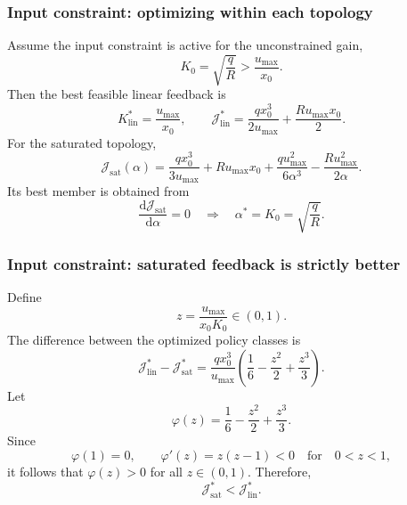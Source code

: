 \begin{frame}
	\frametitle{Input constraint: optimizing within each topology}
	Assume the input constraint is active for the unconstrained gain,
	\begin{equation*}
		K_0=\sqrt{\frac{q}{R}}>\frac{u_{\max}}{x_0} .
	\end{equation*}\pause%
	Then the best feasible linear feedback is
	\begin{equation*}
		K_{\mathrm{lin}}^*=\frac{u_{\max}}{x_0},
		\qquad
		\mathcal{J}_{\mathrm{lin}}^*
		=\frac{q x_0^3}{2u_{\max}}+
		\frac{R u_{\max}x_0}{2} .
	\end{equation*}\pause%
	For the saturated topology,
	\begin{equation*}
		\mathcal{J}_{\mathrm{sat}}(\alpha)
		=\frac{q x_0^3}{3u_{\max}}+Ru_{\max}x_0
		+\frac{q u_{\max}^2}{6\alpha^3}
		-\frac{R u_{\max}^2}{2\alpha} .
	\end{equation*}\pause%
	Its best member is obtained from
	\begin{equation*}
		\frac{\mathrm{d}\mathcal{J}_{\mathrm{sat}}}{\mathrm{d}\alpha}=0
		\quad\Rightarrow\quad
		\alpha^*=K_0=\sqrt{\frac{q}{R}} .
	\end{equation*}
\end{frame}

\begin{frame}
	\frametitle{Input constraint: saturated feedback is strictly better}
	Define
	\begin{equation*}
		z=\frac{u_{\max}}{x_0K_0}\in(0,1).
	\end{equation*}\pause%
	The difference between the optimized policy classes is
	\begin{equation*}
		\mathcal{J}_{\mathrm{lin}}^*-
		\mathcal{J}_{\mathrm{sat}}^*
		=\frac{q x_0^3}{u_{\max}}
		\left(\frac{1}{6}-\frac{z^2}{2}+\frac{z^3}{3}\right).
	\end{equation*}\pause%
	Let
	\begin{equation*}
		\varphi(z)=\frac{1}{6}-\frac{z^2}{2}+\frac{z^3}{3} .
	\end{equation*}\pause%
	Since
	\begin{equation*}
		\varphi(1)=0,
		\qquad
		\varphi'(z)=z(z-1)<0
		\quad\text{for}\quad 0<z<1,
	\end{equation*}\pause%
	it follows that $\varphi(z)>0$ for all $z\in(0,1)$. Therefore,
	\begin{equation*}
		\boxed{\mathcal{J}_{\mathrm{sat}}^*<\mathcal{J}_{\mathrm{lin}}^*.}
	\end{equation*}
\end{frame}

